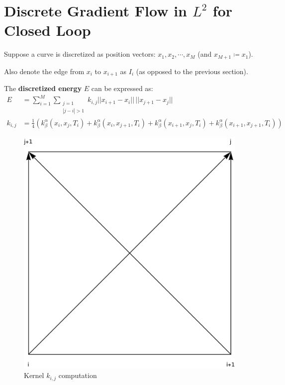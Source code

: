 \documentclass[a4paper, 11pt]{article}
\newcommand{\norm}[1]{||#1||}
\theoremstyle{definition}
\begin{document}
\section{Discrete Gradient Flow in $L^2$ for Closed Loop}
Suppose a curve is discretized as position vectors:
$x_1, x_2, \cdots, x_M$ (and $x_{M+1} \coloneqq x_1$).

Also denote the edge from $x_i$ to $x_{i+1}$ as $I_i$ (as opposed to the previous section).

The \textbf{discretized energy} $E$ can be expressed as:
\begin{align}
    E &= \sum_{i = 1}^{M} \sum_{\substack{j = 1 \\ |j-i| > 1}} k_{i,j} \norm{x_{i+1} - x_i} \, \norm{x_{j+1} - x_j} \\
    k_{i,j} &= \frac{1}{4} \left( 
        k_{\beta}^{\alpha} \left( x_i, x_j, T_i \right)
        + k_{\beta}^{\alpha} \left( x_i, x_{j+1}, T_i \right)
        + k_{\beta}^{\alpha} \left( x_{i+1}, x_j, T_i \right)
        + k_{\beta}^{\alpha} \left( x_{i+1}, x_{j+1}, T_i \right)
    \right)
\end{align}

\begin{figure}[h]
    \centering
    \includegraphics[scale=0.6]{kernel-2x2.png}
    \caption{Kernel $k_{i,j}$ computation}
\end{figure}
\end{document}
